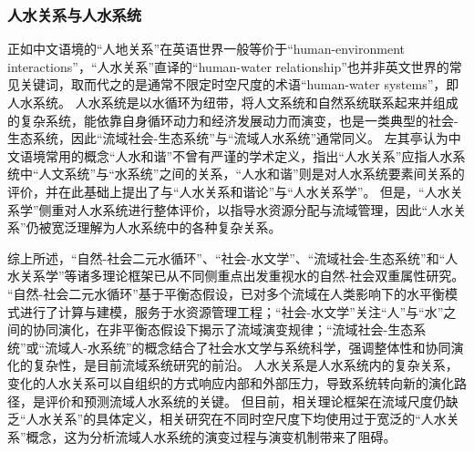 \subsubsection*{人水关系与人水系统}

正如中文语境的“人地关系”在英语世界一般等价于“human-environment interactions”\cite{li2016c, liu2023}，“人水关系”直译的“human-water relationship”也并非英文世界的常见关键词，取而代之的是通常不限定时空尺度的术语“human-water systems”，即人水系统。
人水系统是以水循环为纽带，将人文系统和自然系统联系起来并组成的复杂系统，能依靠自身循环动力和经济发展动力而演变\cite{zuo2007}，也是一类典型的社会-生态系统，因此“流域社会-生态系统”与“流域人水系统”通常同义\cite{yu2020}。
左其亭认为中文语境常用的概念“人水和谐”不曾有严谨的学术定义\cite{zuo2007}，指出“人水关系”应指人水系统中“人文系统”与“水系统”之间的关系，“人水和谐”则是对人水系统要素间关系的评价，并在此基础上提出了与“人水关系和谐论”与“人水关系学”\cite{zuoqiting2022, zuo2016a}。
但是，“人水关系学”侧重对人水系统进行整体评价，以指导水资源分配与流域管理，因此“人水关系”仍被宽泛理解为人水系统中的各种复杂关系\cite{zuo2016, zuo2020a}。

综上所述，“自然-社会二元水循环”、“社会-水文学”、“流域社会-生态系统”和“人水关系学”等诸多理论框架已从不同侧重点出发重视水的自然-社会双重属性研究。
“自然-社会二元水循环”基于平衡态假设，已对多个流域在人类影响下的水平衡模式进行了计算与建模，服务于水资源管理工程；“社会-水文学”关注“人”与“水”之间的协同演化，在非平衡态假设下揭示了流域演变规律；“流域社会-生态系统”或“流域人-水系统”的概念结合了社会水文学与系统科学，强调整体性和协同演化的复杂性，是目前流域系统研究的前沿。
人水关系是人水系统内的复杂关系，变化的人水关系可以自组织的方式响应内部和外部压力，导致系统转向新的演化路径，是评价和预测流域人水系统的关键。
但目前，相关理论框架在流域尺度仍缺乏“人水关系”的具体定义，相关研究在不同时空尺度下均使用过于宽泛的“人水关系”概念，这为分析流域人水系统的演变过程与演变机制带来了阻碍。
